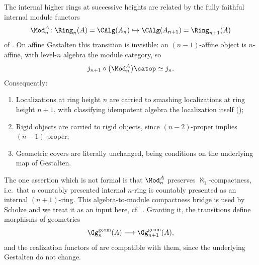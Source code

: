 	The internal higher rings at successive heights are related by the fully faithful internal module functors
	\[
		\Mod^A_{n}\colon \Ring_n(A) = \CAlg(A_{n}) \hookrightarrow \CAlg(A_{n+1}) = \Ring_{n+1}(A)
	\]
	of . On affine Gestalten this transition is invisible: an $(n-1)$-affine object is $n$-affine, with level-$n$ algebra the module category, so
	\[
		j_{n+1} \circ \bigl(\Mod^A_{n}\bigr)\catop \simeq j_n.
	\]
	Consequently:
	\begin{enumerate}
		\item Localizations at ring height $n$ are carried to smashing localizations at ring height $n+1$, with classifying idempotent algebra the localization itself ();
		\item Rigid objects are carried to rigid objects, since $(n-2)$-proper implies $(n-1)$-proper;
		\item Geometric covers are literally unchanged, being conditions on the underlying map of Gestalten.
	\end{enumerate}
	The one assertion which is not formal is that $\Mod^A_{n}$ preserves $\aleph_1$-compactness, i.e.\ that a countably presented internal $n$-ring is countably presented as an internal $(n+1)$-ring. This algebra-to-module compactness bridge is used by Scholze and we treat it as an input here, cf.\ . Granting it, the transitions define morphisms of geometries
	\[
		\Gg^{\mathrm{geom}}_n(A) \longrightarrow \Gg^{\mathrm{geom}}_{n+1}(A),
	\]
	and the realization functors of  are compatible with them, since the underlying Gestalten do not change.

